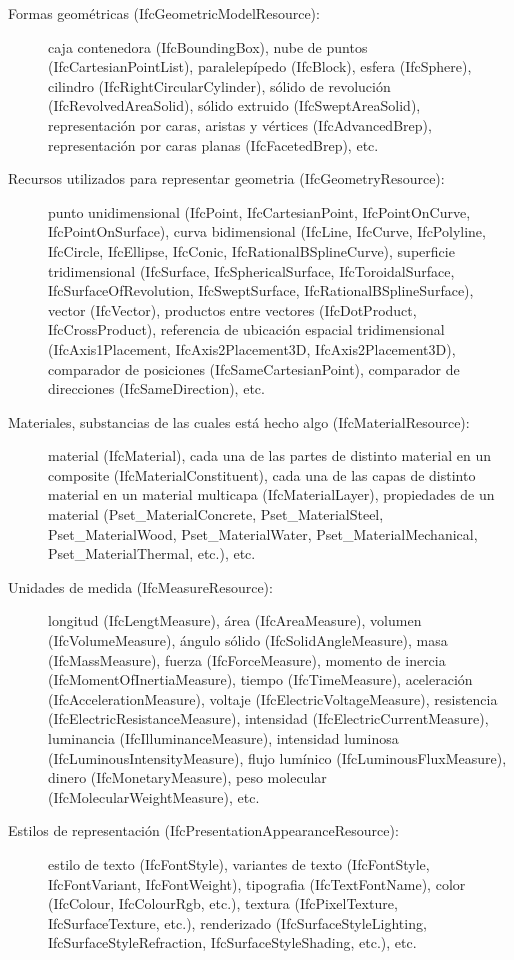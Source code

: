 \documentclass[spanish,12pt,a4paper,final,oneside]{book}
\begin{document}
\begin{description}
\item[Formas geométricas (IfcGeometricModelResource):] caja contenedora (IfcBoundingBox), nube de puntos (IfcCartesianPointList), paralelepípedo (IfcBlock), esfera (IfcSphere), cilindro (IfcRightCircularCylinder), sólido de revolución (IfcRevolvedAreaSolid), sólido extruido (IfcSweptAreaSolid), representación por caras, aristas y vértices  (IfcAdvancedBrep), representación por caras planas (IfcFacetedBrep), etc.

\item[Recursos utilizados para representar geometria (IfcGeometryResource):] punto unidimensional (IfcPoint, IfcCartesianPoint, IfcPointOnCurve, IfcPointOnSurface), curva bidimensional (IfcLine, IfcCurve, IfcPolyline, IfcCircle, IfcEllipse, IfcConic, IfcRationalBSplineCurve), superficie tridimensional (IfcSurface, IfcSphericalSurface, IfcToroidalSurface, IfcSurfaceOfRevolution, IfcSweptSurface, IfcRationalBSplineSurface), vector (IfcVector), productos entre vectores (IfcDotProduct, IfcCrossProduct), referencia de ubicación espacial tridimensional (IfcAxis1Placement, IfcAxis2Placement3D, IfcAxis2Placement3D), comparador de posiciones (IfcSameCartesianPoint), comparador de direcciones (IfcSameDirection), etc.

\item[Materiales, substancias de las cuales está hecho algo (IfcMaterialResource):] material (IfcMaterial), cada una de las partes de distinto material en un composite (IfcMaterialConstituent), cada una de las capas de distinto material en un material multicapa (IfcMaterialLayer), propiedades de un material (Pset\_MaterialConcrete, Pset\_MaterialSteel, Pset\_MaterialWood, Pset\_MaterialWater, Pset\_MaterialMechanical, Pset\_MaterialThermal, etc.), etc.

\item[Unidades de medida (IfcMeasureResource):] longitud (IfcLengtMeasure), área (IfcAreaMeasure), volumen (IfcVolumeMeasure), ángulo sólido (IfcSolidAngleMeasure), masa (IfcMassMeasure), fuerza (IfcForceMeasure), momento de inercia (IfcMomentOfInertiaMeasure), tiempo (IfcTimeMeasure), aceleración (IfcAccelerationMeasure), voltaje (IfcElectricVoltageMeasure), resistencia (IfcElectricResistanceMeasure), intensidad (IfcElectricCurrentMeasure), luminancia (IfcIlluminanceMeasure), intensidad luminosa (IfcLuminousIntensityMeasure), flujo lumínico (IfcLuminousFluxMeasure), dinero (IfcMonetaryMeasure), peso molecular (IfcMolecularWeightMeasure), etc.

\item[Estilos de representación (IfcPresentationAppearanceResource):] estilo de texto (IfcFontStyle), variantes de texto (IfcFontStyle, IfcFontVariant, IfcFontWeight), tipografia (IfcTextFontName), color (IfcColour, IfcColourRgb, etc.), textura (IfcPixelTexture, IfcSurfaceTexture, etc.), renderizado (IfcSurfaceStyleLighting, IfcSurfaceStyleRefraction, IfcSurfaceStyleShading, etc.), etc.  


\end{description}
\end{document}

